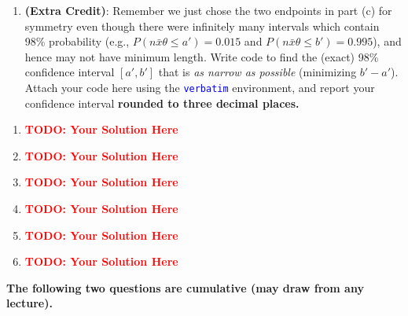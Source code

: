 \documentclass[12pt]{article}
\def\todo#1{\textcolor{red}{\textbf{#1}}}
\def\code#1{\textcolor{blue}{\texttt{#1}}}
\renewcommand{\|}{\mid}
\begin{document}
\begin{enumerate}
\begin{enumerate}
        \item \textbf{(Extra Credit)}: Remember we just chose the two endpoints in part (c) for symmetry even though there were infinitely many intervals which contain 98\% probability (e.g., $P\left(n\bar{x}\theta\le a'\right)=0.015$ and $P\left(n\bar{x}\theta\le b'\right)=0.995$), and hence may not have minimum length. Write code to find the (exact) 98\% confidence interval $[a',b']$ that is \textit{as narrow as possible} (minimizing $b'-a'$). Attach your code here using the \code{verbatim} environment, and report your confidence interval  \textbf{rounded to three decimal places.}
    \end{enumerate}
    
    \begin{tcolorbox}
\begin{enumerate}
\item \todo{TODO: Your Solution Here}
\item \todo{TODO: Your Solution Here}
\item \todo{TODO: Your Solution Here}
\item \todo{TODO: Your Solution Here}
\item \todo{TODO: Your Solution Here}
\item \todo{TODO: Your Solution Here}
\end{enumerate}
\end{tcolorbox}

\pagebreak

\textbf{The following two questions are cumulative (may draw from any lecture).}


\end{enumerate}
\end{document}
